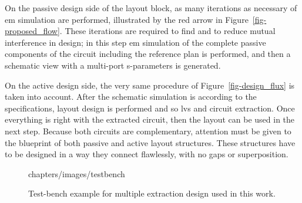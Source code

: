 On the passive design side of the layout block, as many iterations as necessary of \gls{em} simulation are performed, illustrated by the red arrow in Figure~\ref{fig-proposed_flow}. These iterations are required to find and to reduce mutual interference in design; in this step \gls{em} simulation of the complete passive components of the circuit including the reference plan is performed, and then a schematic view with a multi-port s-parameters  is generated.

On the active design side, the very same procedure of Figure~\ref{fig-design_flux} is taken into account. After the schematic simulation is according to the specifications, layout design is performed and so \gls{lvs} and circuit extraction. Once everything is right with the extracted circuit, then the layout can be used in the next step. Because both circuits are complementary, attention must be given to the blueprint of both passive and active layout structures. These structures have to be designed in a way they connect flawlessly, with no gaps or superposition.

\begin{figure}[!hbt]
	\centering
		\begin{overpic}[]{chapters/images/testbench}
		\end{overpic}
	\caption{Test-bench example for multiple extraction design used in this work.}
	\label{fig_testbench}
\end{figure}

